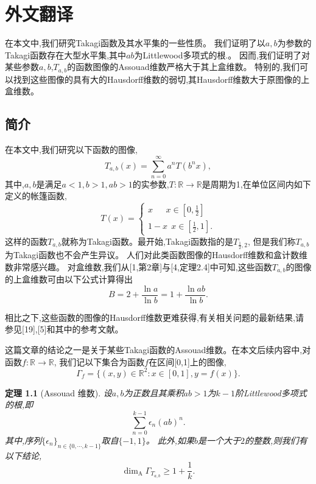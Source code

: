 \cleardoublepage

\newrefsection

\newtheorem{theorem}{定理}[section]
\newtheorem{remark}[theorem]{评注}
\newtheorem{lemma}[theorem]{引理}
\newtheorem{question}[theorem]{问题}
\newtheorem{definition}[theorem]{定义}
\newtheorem{theoremno}{定理}
\newcommand{\Hdim}{\mathrm{\dim_H}}
\newcommand{\Adim}{\mathrm{\dim_A}}
\newcommand{\Bdim}{\mathrm{\dim_B}}
\newcommand{\diam}{\mathrm{diam}}
\newcommand{\Hd}{\mathrm{d}_\mathcal{H}}
\chapter{外文翻译}


在本文中,我们研究Takagi函数及其水平集的一些性质。
我们证明了以$a,b$为参数的Takagi函数存在大型水平集,其中$ab$为Littlewood多项式的根.。
因而,我们证明了对某些参数$a,b$,$T_{a,b}$的函数图像的Assouad维数严格大于其上盒维数。
特别的,我们可以找到这些图像的具有大的Hausdorff维数的弱切,其Hausdorff维数大于原图像的上盒维数。

\section{简介}
在本文中,我们研究以下函数的图像,
$$
T_{a,b}(x)=\sum_{n=0}^\infty a^nT(b^nx),
$$
其中,$a,b$是满足$a<1,b>1,ab>1$的实参数,$T:\mathbb{R}\rightarrow\mathbb{R}$是周期为1,在单位区间内如下定义的帐篷函数,
$$
T(x)=\begin{cases}x~~~~~~~x\in[0,\frac{1}{2}] \\ 1-x~~x\in[\frac{1}{2},1].\end{cases}
$$
这样的函数$T_{a,b}$就称为Takagi函数。最开始,Takagi函数指的是$T_{\frac{1}{2},2}$,
但是我们称$T_{a,b}$为Takagi函数也不会产生异议。
人们对此类函数图像的Hausdorff维数和盒计数维数非常感兴趣。
对盒维数,我们从[1,第2章]与[4,定理2.4]中可知,这些函数$T_{a,b}$的图像的上盒维数可由以下公式计算得出
$$
B = 2 + \frac{\ln a}{\ln b} = 1 + \frac{\ln ab}{\ln b}.
$$

相比之下,这些函数的图像的Hausdorff维数更难获得,有关相关问题的最新结果,请参见[19],[5]和其中的参考文献。

这篇文章的结论之一是关于某些Takagi函数的Assouad维数。在本文后续内容中,对函数$f:\mathbb{R}\rightarrow\mathbb{R}$,
我们记以下集合为函数$f$在区间[0,1]上的图像,
$$
\Gamma_f=\{(x,y)\in\mathbb{R}^2:x\in[0,1],y=f(x)\}.
$$

\begin{theorem}[Assouad 维数]
      设$a,b$为正数且其乘积$ab>1$为$k-1$阶Littlewood多项式的根,即
      $$
      \sum_{n=0}^{k-1}\epsilon_n(ab)^n.
      $$
      其中,序列$\{\epsilon_n\}_{n\in\{0,\cdots,k-1\}}$取自$\{-1,1\}$。
      此外,如果$b$是一个大于$2$的整数,则我们有以下结论,
      $$
      \Adim\Gamma_{T_{a,b}}\ge1+\frac{1}{k}.
      $$
\end{theorem}

